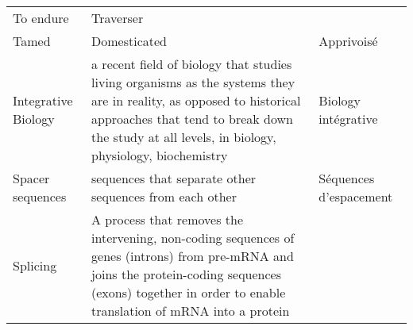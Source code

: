 \documentclass[]{article}
\begin{document}
\begin{longtable}[]{@{}lll@{}}
\begin{minipage}[t]{0.18\columnwidth}
To endure\strut
\end{minipage} & \begin{minipage}[t]{0.56\columnwidth}\raggedright
Traverser\strut
\end{minipage}\tabularnewline
\begin{minipage}[t]{0.18\columnwidth}\raggedright
Tamed\strut
\end{minipage} & \begin{minipage}[t]{0.18\columnwidth}\raggedright
Domesticated\strut
\end{minipage} & \begin{minipage}[t]{0.56\columnwidth}\raggedright
Apprivoisé\strut
\end{minipage}\tabularnewline
\begin{minipage}[t]{0.18\columnwidth}\raggedright
Integrative Biology\strut
\end{minipage} & \begin{minipage}[t]{0.18\columnwidth}\raggedright
a recent field of biology that studies living organisms as the systems
they are in reality, as opposed to historical approaches that tend to
break down the study at all levels, in biology, physiology,
biochemistry\strut
\end{minipage} & \begin{minipage}[t]{0.56\columnwidth}\raggedright
Biology intégrative\strut
\end{minipage}\tabularnewline
\begin{minipage}[t]{0.18\columnwidth}\raggedright
Spacer sequences\strut
\end{minipage} & \begin{minipage}[t]{0.18\columnwidth}\raggedright
sequences that separate other sequences from each other\strut
\end{minipage} & \begin{minipage}[t]{0.56\columnwidth}\raggedright
Séquences d'espacement\strut
\end{minipage}\tabularnewline
\begin{minipage}[t]{0.18\columnwidth}\raggedright
Splicing\strut
\end{minipage} & \begin{minipage}[t]{0.18\columnwidth}\raggedright
A process that removes the intervening, non-coding sequences of genes
(introns) from pre-mRNA and joins the protein-coding sequences (exons)
together in order to enable translation of mRNA into a protein\strut
\end{minipage} & \begin{minipage}[t]{0.56\columnwidth}\raggedright

\end{minipage}
\end{longtable}
\end{document}
